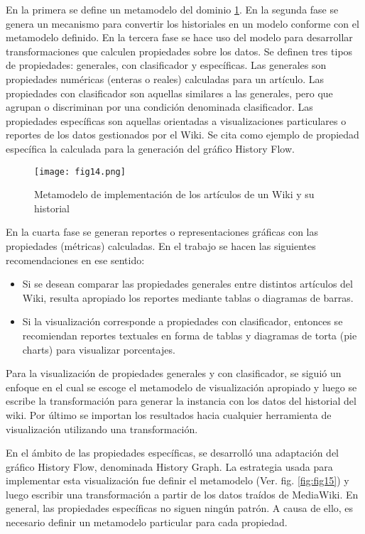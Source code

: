 En la primera se define un metamodelo del dominio \ref{fig:fig14}. En la segunda fase se genera un mecanismo para convertir los historiales en un modelo conforme con el metamodelo definido. En la tercera fase se hace uso del modelo para desarrollar transformaciones que calculen propiedades sobre los datos. Se definen tres tipos de propiedades: generales, con clasificador y específicas. Las generales son propiedades numéricas (enteras o reales) calculadas para un artículo. Las propiedades con clasificador son aquellas similares a las generales, pero que agrupan o discriminan por una condición denominada clasificador. Las propiedades específicas son aquellas orientadas a visualizaciones particulares o reportes de los datos gestionados por el Wiki. Se cita como ejemplo de propiedad específica la calculada para la generación del gráfico History Flow.

\begin{figure}[htp]
  \centering
  \texttt{[image: fig14.png]}
  \caption[Metamodelo de implementación de los artículos de un Wiki y su historial]{Metamodelo de implementación de los artículos de un Wiki y su historial \cite[Fig. 2]{Sca08}}
  \label{fig:fig14}
\end{figure}

En la cuarta fase se generan reportes o representaciones gráficas con las propiedades (métricas) calculadas. En el trabajo se hacen las siguientes recomendaciones en ese sentido:

\begin{itemize}
  \item Si se desean comparar las propiedades generales entre distintos artículos del Wiki, resulta apropiado los reportes mediante tablas o diagramas de barras.
  \item Si la visualización corresponde a propiedades con clasificador, entonces se recomiendan reportes textuales en forma de tablas y diagramas de torta (pie charts) para visualizar porcentajes.
\end{itemize}

Para la visualización de propiedades generales y con clasificador, se siguió un enfoque en el cual se escoge el metamodelo de visualización apropiado y luego se escribe la transformación para generar la instancia con los datos del historial del wiki. Por último se importan los resultados hacia cualquier herramienta de visualización utilizando una transformación.

En el ámbito de las propiedades específicas, se desarrolló una adaptación del gráfico History Flow, denominada History Graph. La estrategia usada para implementar esta visualización fue definir el metamodelo (Ver. fig. \ref{fig:fig15}) y luego escribir una transformación a partir de los datos traídos de MediaWiki. En general, las propiedades específicas no siguen ningún patrón. A causa de ello, es necesario definir un metamodelo particular para cada propiedad.

